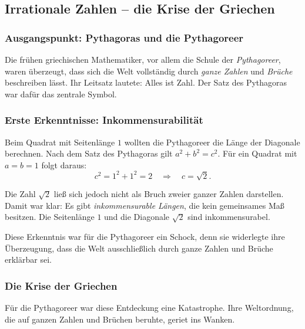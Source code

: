 
\subsection{Irrationale Zahlen – die Krise der Griechen}
\label{sec:2.2_irrat}

\subsubsection{Ausgangspunkt: Pythagoras und die Pythagoreer}
Die frühen griechischen Mathematiker, vor allem die Schule der 
\emph{Pythagoreer}, waren überzeugt, dass sich die Welt vollständig 
durch \emph{ganze Zahlen} und \emph{Brüche} beschreiben lässt. 
Ihr Leitsatz lautete: \glqq Alles ist Zahl.\grqq 
Der Satz des Pythagoras war dafür das zentrale Symbol.

\subsubsection{Erste Erkenntnisse: Inkommensurabilität}
Beim Quadrat mit Seitenlänge $1$ wollten die Pythagoreer 
die Länge der Diagonale berechnen. 
Nach dem Satz des Pythagoras gilt 
$a^2+b^2=c^2$. Für ein Quadrat mit $a=b=1$ folgt daraus:
\[
c^2 = 1^2 + 1^2 = 2 \quad \Rightarrow \quad c = \sqrt{2}.
\]

Die Zahl $\sqrt{2}$ ließ sich jedoch nicht als Bruch zweier ganzer Zahlen darstellen. 
Damit war klar: Es gibt \emph{inkommensurable Längen}, 
die kein gemeinsames Maß besitzen. 
Die Seitenlänge $1$ und die Diagonale $\sqrt{2}$ sind inkommensurabel.

Diese Erkenntnis war für die Pythagoreer ein Schock, 
denn sie widerlegte ihre Überzeugung, dass die Welt ausschließlich 
durch ganze Zahlen und Brüche erklärbar sei.


\subsubsection{Die Krise der Griechen}
Für die Pythagoreer war diese Entdeckung eine Katastrophe. 
Ihre Weltordnung, die auf ganzen Zahlen und Brüchen beruhte, geriet ins Wanken. 

